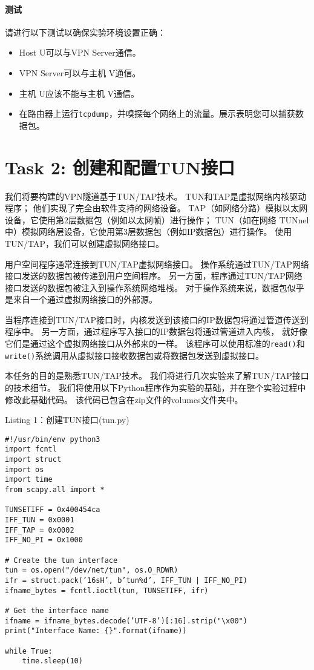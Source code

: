 \paragraph{测试}
请进行以下测试以确保实验环境设置正确：

\begin{itemize}[noitemsep]
\item Host U可以与VPN Server通信。
\item VPN Server可以与主机 V通信。 
\item 主机 U应该不能与主机 V通信。
\item 在路由器上运行\verb|tcpdump|，并嗅探每个网络上的流量。展示表明您可以捕获数据包。
\end{itemize}


\section{Task 2: 创建和配置TUN接口} 

我们将要构建的VPN隧道基于TUN/TAP技术。 
TUN和TAP是虚拟网络内核驱动程序；
他们实现了完全由软件支持的网络设备。 
TAP（如网络分路）模拟以太网设备，它使用第2层数据包（例如以太网帧）进行操作；
TUN（如在网络 TUNnel 中）模拟网络层设备，它使用第3层数据包（例如IP数据包）进行操作。
使用TUN/TAP，我们可以创建虚拟网络接口。

用户空间程序通常连接到TUN/TAP虚拟网络接口。
操作系统通过TUN/TAP网络接口发送的数据包被传递到用户空间程序。
另一方面，程序通过TUN/TAP网络接口发送的数据包被注入到操作系统网络堆栈。
对于操作系统来说，数据包似乎是来自一个通过虚拟网络接口的外部源。

当程序连接到TUN/TAP接口时，内核发送到该接口的IP数据包将通过管道传送到程序中。
另一方面，通过程序写入接口的IP数据包将通过管道进入内核，
就好像它们是通过这个虚拟网络接口从外部来的一样。
该程序可以使用标准的\verb|read()|和\verb|write()|系统调用从虚拟接口接收数据包或将数据包发送到虚拟接口。

本任务的目的是熟悉TUN/TAP技术。
我们将进行几次实验来了解TUN/TAP接口的技术细节。
我们将使用以下Python程序作为实验的基础，并在整个实验过程中修改此基础代码。
该代码已包含在zip文件的volumes文件夹中。

\begin{center}
Listing 1：创建TUN接口(tun.py)
\end{center}
\begin{lstlisting}
#!/usr/bin/env python3
import fcntl
import struct
import os
import time
from scapy.all import *

TUNSETIFF = 0x400454ca
IFF_TUN = 0x0001
IFF_TAP = 0x0002
IFF_NO_PI = 0x1000

# Create the tun interface
tun = os.open("/dev/net/tun", os.O_RDWR)
ifr = struct.pack(’16sH’, b’tun%d’, IFF_TUN | IFF_NO_PI)
ifname_bytes = fcntl.ioctl(tun, TUNSETIFF, ifr)

# Get the interface name
ifname = ifname_bytes.decode(’UTF-8’)[:16].strip("\x00")
print("Interface Name: {}".format(ifname))

while True:
    time.sleep(10)
\end{lstlisting}


